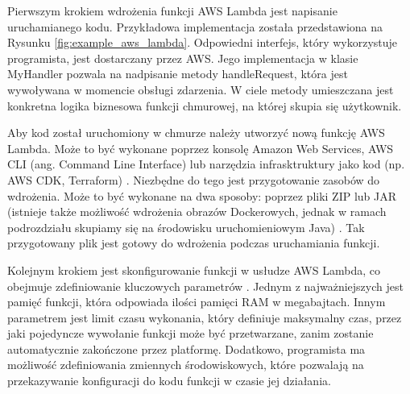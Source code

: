 
Pierwszym krokiem wdrożenia funkcji AWS Lambda jest napisanie uruchamianego kodu.
Przykładowa implementacja została przedstawiona na Rysunku \ref{fig:example_aws_lambda}. 
Odpowiedni interfejs, który wykorzystuje programista, jest dostarczany przez AWS.
Jego implementacja w klasie MyHandler pozwala na nadpisanie metody handleRequest, która jest wywoływana w momencie obsługi zdarzenia.
W ciele metody umieszczana jest konkretna logika biznesowa funkcji chmurowej, na której skupia się użytkownik.

Aby kod został uruchomiony w chmurze należy utworzyć nową funkcję AWS Lambda.
Może to być wykonane poprzez konsolę Amazon Web Services, AWS CLI (ang. Command Line Interface) lub narzędzia infrasktruktury jako kod (np. AWS CDK, Terraform) \cite{awsLambdaDocs}.
Niezbędne do tego jest przygotowanie zasobów do wdrożenia.
Może to być wykonane na dwa sposoby: poprzez pliki ZIP lub JAR (istnieje także możliwość wdrożenia obrazów Dockerowych, jednak w ramach podrozdziału skupiamy się na środowisku uruchomieniowym Java) \cite{awsLambdaDocs}.
Tak przygotowany plik jest gotowy do wdrożenia podczas uruchamiania funkcji.

Kolejnym krokiem jest skonfigurowanie funkcji w usłudze AWS Lambda, co obejmuje zdefiniowanie kluczowych parametrów \cite{awsLambdaDocs}.
Jednym z najważniejszych jest pamięć funkcji, która odpowiada ilości pamięci RAM w megabajtach.
Innym parametrem jest limit czasu wykonania, który definiuje maksymalny czas, przez jaki pojedyncze wywołanie funkcji może być przetwarzane, zanim zostanie automatycznie zakończone przez platformę. 
Dodatkowo, programista ma możliwość zdefiniowania zmiennych środowiskowych, które pozwalają na przekazywanie konfiguracji do kodu funkcji w czasie jej działania.

